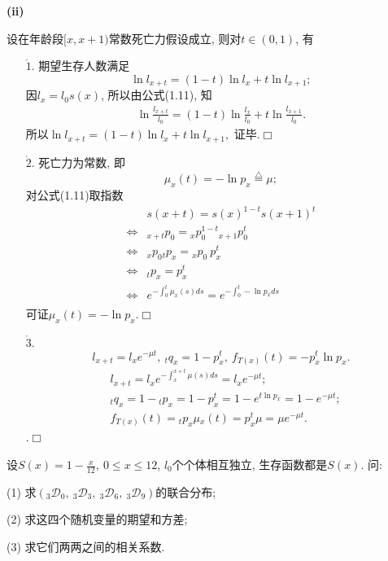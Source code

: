 \documentclass[a4paper,10pt]{ctexbook}
\def\qed{\hfill$\Box$\medskip}
\begin{document}
{\rm\bf(ii)}  \begin{proposition}设在年龄段$[x,x+1)$常数死亡力假设成立, 则对$t\in (0,1)$, 有
    \begin{enumerate}
        \item[$\mathring 1.$] 期望生存人数满足
            $$\ln l_{x+t}=(1-t)\ln l_{x}+t\ln l_{x+1};$$
            \proof 因$l_{x}=l_{0}s(x)$, 所以由公式(1.11), 知\begin{align*}
                \ln \frac{l_{x+t}}{l_{0}}=(1-t)\ln \frac{l_{x}}{l_{0}}+t\ln \frac{l_{x+1}}{l_{0}}.
            \end{align*}所以$\ln l_{x+t}=(1-t)\ln l_{x}+t\ln l_{x+1},$
            证毕.\qed
        \item[$\mathring 2.$] 死亡力为常数, 即
            $$\mu _{x}(t)=-\ln p_{x}\stackrel{\triangle}{=}\mu;$$
            \proof 对公式(1.11)取指数
            \begin{align*}
                                    & s(x+t)  =s(x)^{1-t}s(x+1)^{t}                              \\
                \Longleftrightarrow & {}_{x+t}p_{0} = {}_xp_{0}^{1-t}{}_{x+1}p_{0}^t             \\
                \Longleftrightarrow & {}_{x}p_{0}{}_{t}p_x = {}_xp_{0}~p_{x}^{t}                 \\
                \Longleftrightarrow & {}_{t}p_x = p_x^t                                          \\
                \Longleftrightarrow & e^{-\int_{0}^{t}\mu_x(s)ds} = e^{-\int_{0}^{t}-\ln p_x ds} \\
            \end{align*}
            可证$\mu _{x}(t)=-\ln p_{x}$.\qed
        \item[$\mathring 3.$] $$l_{x+t}=l_{x}e^{-\mu t},\ _{t}q_{x}=1-p^{t}_{x},\ f_{T(x)}(t)=-p_{x}^{t}\ln p_{x}.$$
            \proof \begin{align*}
                 & l_{x+t}=l_{x}e^{-\int_{x}^{x+t}\mu (s)ds}=l_{x}e^{-\mu t};         \\
                 & _{t}q_{x}=1-{}_{t}p_{x}=1-p_{x}^{t}=1-e^{t\ln p_{x}}=1-e^{-\mu t}; \\
                 & f_{T(x)}(t)={}_{t}p_{x}\mu {}_{x}(t)=p_{x}^{t}\mu=\mu e^{-\mu t}.
            \end{align*}.\qed
    \end{enumerate}
\end{proposition}

\begin{example}
    设$S(x)=1-\frac{x}{12},\ 0\leq x\leq 12$, $l_{0}$个个体相互独立, 生存函数都是$S(x)$. 问:

    (1) 求$(_{3}\mathscr D _{0},\ _{3}\mathscr D_{3},\ _{3}\mathscr D _{6},\ _{3}\mathscr D _{9})$的联合分布;

    (2) 求这四个随机变量的期望和方差;

    (3) 求它们两两之间的相关系数.
\end{example}
\end{document}
